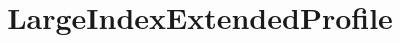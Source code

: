 \documentclass{test}
\begin{document}
\title{LargeIndexExtendedProfile} \maketitle \noindent




\end{document}

